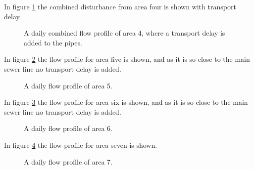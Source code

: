 In figure \ref{fig:flow_profile_zone_4_combined_with_delay} the combined disturbance from area four is shown with transport delay. 

\begin{figure}[H]
\centering

\caption{A daily combined flow profile of area 4, where a transport delay is added to the pipes.}
\label{fig:flow_profile_zone_4_combined_with_delay}
\end{figure} 

In figure \ref{fig:APP_flow_profile_zone5} the flow profile for area five is shown, and as it is so close to the main sewer line no transport delay is added. 

\begin{figure}[H]
\centering

\caption{A daily flow profile of area 5.}
\label{fig:APP_flow_profile_zone5}
\end{figure} 

% 

In figure \ref{fig:APP_flow_profile_zone6} the flow profile for area six is shown, and as it is so close to the main sewer line no transport delay is added. 

\begin{figure}[H]
\centering

\caption{A daily flow profile of area 6.}
\label{fig:APP_flow_profile_zone6}
\end{figure} 

% 

In figure \ref{fig:APP_flow_profile_zone7} the flow profile for area seven is shown. 

\begin{figure}[H]
\centering

\caption{A daily flow profile of area 7.}
\label{fig:APP_flow_profile_zone7}
\end{figure} 

